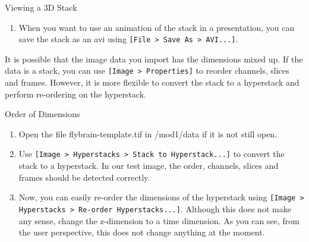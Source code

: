 \begin{taskbox}{Viewing a 3D Stack}
\begin{enumerate}
	\begin{minipage}[t]{\linewidth}
		\begin{center}
		\medskip
		\label{fig:animation-options-dialog}
		\end{center}
	\end{minipage}
	
	\item When you want to use an animation of the stack in a presentation, you can save the stack as an avi using \texttt{[File > Save As > AVI...]}.
	
\end{enumerate}

\end{taskbox}

It is possible that the image data you import has the dimensions mixed up. If the data is a stack, you can use \texttt{[Image > Properties]} to reorder channels, slices and frames. However, it is more flexible to convert the stack to a hyperstack and perform re-ordering on the hyperstack.

\begin{taskbox}{Order of Dimensions}

\begin{enumerate}
	\item Open the file flybrain-template.tif in /mod1/data if it is not still open.
	\item Use \texttt{[Image > Hyperstacks > Stack to Hyperstack...]} to convert the stack to a hyperstack. In our test image, the order, channels, slices and frames should be detected correctly. 
	\item Now, you can easily re-order the dimensions of the hyperstack using \texttt{[Image > Hyperstacks > Re-order Hyperstacks...]}. Although this does not make any sense, change the z-dimension to a time dimension. As you can see, from the user perspective, this does not change anything at the moment.
\end{enumerate}

\end{taskbox}


